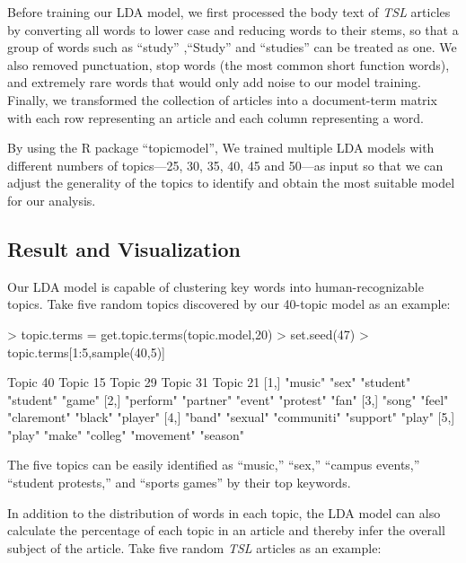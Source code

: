 \documentclass[a4paper]{article}
\begin{document}
Before training our LDA model, we first processed the body text of \textit{TSL} articles by converting all words to lower case and reducing words to their stems, so that a group of words such as ``study'' ,``Study''  and ``studies''  can be treated as one. We also removed punctuation, stop words (the most common short function words), and extremely rare words that would only add noise to our model training. Finally, we transformed the collection of articles into a document-term matrix with each row representing an article and each column representing a word. 

By using the R package ``topicmodel'', We trained multiple LDA models with different numbers of topics---25, 30, 35, 40, 45 and 50---as input so that we can adjust the generality of the topics to identify and obtain the most suitable model for our analysis.

\subsection{Result and Visualization}

Our LDA model is capable of clustering key words into human-recognizable topics. Take five random topics discovered by our 40-topic model as an example:

\begin{Schunk}
\begin{Sinput}
> topic.terms = get.topic.terms(topic.model,20)
> set.seed(47)
> topic.terms[1:5,sample(40,5)]
\end{Sinput}
\begin{Soutput}
     Topic 40  Topic 15  Topic 29    Topic 31   Topic 21
[1,] "music"   "sex"     "student"   "student"  "game"  
[2,] "perform" "partner" "event"     "protest"  "fan"   
[3,] "song"    "feel"    "claremont" "black"    "player"
[4,] "band"    "sexual"  "communiti" "support"  "play"  
[5,] "play"    "make"    "colleg"    "movement" "season"
\end{Soutput}
\end{Schunk}

The five topics can be easily identified as ``music,'' ``sex,'' ``campus events,'' ``student protests,'' and ``sports games'' by their top keywords.

In addition to the distribution of words in each topic, the LDA model can also calculate the percentage of each topic in an article and thereby infer the overall subject of the article. Take five random \textit{TSL} articles as an example:
\end{document}
